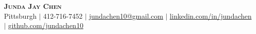 
\begin{center}
    \textbf{\Huge \scshape Junda Jay Chen} \\ \vspace{1pt}
    \small Pittsburgh $|$ 412-716-7452 $|$ \href{mailto:x@x.com}{\underline{jundachen10@gmail.com}} $|$ 
    \href{https://linkedin.com/in/jundachen}{\underline{linkedin.com/in/jundachen}} $|$
    \href{https://github.com/jundachen10}{\underline{github.com/jundachen10}}
\end{center}
